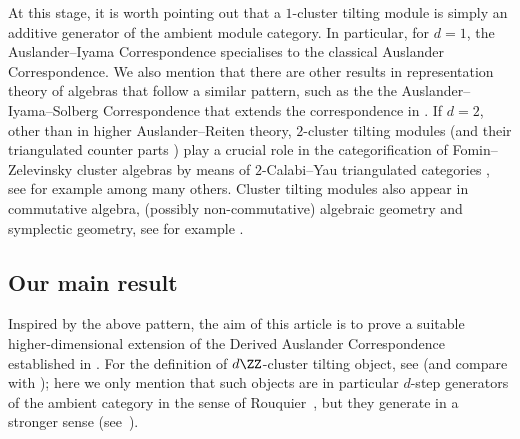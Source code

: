 \documentclass[a4paper]{amsart}
\begin{document}
At this stage, it is worth pointing out that a $1$-cluster tilting module is
simply an additive generator of the ambient module category. In particular, for
$d=1$, the Auslander--Iyama Correspondence specialises to the classical
Auslander Correspondence. We also mention that there are other results in
representation theory of algebras that follow a similar pattern, such as the the
Auslander--Iyama--Solberg Correspondence \cite{IS18} that extends the
correspondence in \cite{AS93d}. If $d=2$, other than in higher Auslander--Reiten
theory, $2$-cluster tilting modules (and their triangulated counter parts
\cite{IY08}) play a crucial role in the categorification of Fomin--Zelevinsky
cluster algebras \cite{FZ02} by means of $2$-Calabi--Yau triangulated categories
\cite{Kel08}, see for example \cite{Ami09,BMR+06,BIRS09,DK08,GLS06,Kel13a,Pal08}
among many others. Cluster tilting modules also appear in commutative algebra,
(possibly non-commutative) algebraic geometry and symplectic geometry, see for
example \cite{AIR15,DJL21,HIMO14,IT13,IW14}.

\subsection*{Our main result}

Inspired by the above pattern, the aim of this article is to prove a suitable
higher-dimensional extension of the Derived Auslander Correspondence
established in \cite{Mur22}. For the definition of $d\ZZ$-cluster tilting
object, see  (and compare with ); here we only
mention that such objects are in particular $d$-step generators of the ambient
category in the sense of Rouquier~\cite{Rou08}, but they generate in a stronger
sense (see~).
\end{document}
